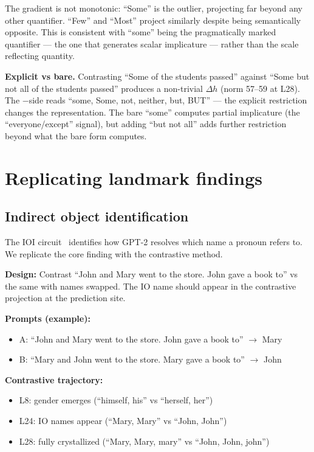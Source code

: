 \documentclass[11pt]{article}
\newcommand{\dhh}{\Delta h}
\begin{document}
The gradient is not monotonic: ``Some'' is the outlier, projecting far beyond
any other quantifier. ``Few'' and ``Most'' project similarly despite being
semantically opposite. This is consistent with ``some'' being the
pragmatically marked quantifier --- the one that generates scalar implicature
--- rather than the scale reflecting quantity.

\textbf{Explicit vs bare.} Contrasting ``Some of the students passed'' against
``Some but not all of the students passed'' produces a non-trivial $\dhh$ (norm
57--59 at L28). The $-$side reads ``some, Some, not, neither, but, BUT'' --- the
explicit restriction changes the representation. The bare ``some'' computes
partial implicature (the ``everyone/except'' signal), but adding ``but not all''
adds further restriction beyond what the bare form computes.

\section{Replicating landmark findings}

\subsection{Indirect object identification}

The IOI circuit~\citep{wang2023} identifies how GPT-2 resolves which name a
pronoun refers to. We replicate the core finding with the contrastive method.

\textbf{Design:} Contrast ``John and Mary went to the store. John gave a book to'' vs
the same with names swapped. The IO name should appear in the contrastive
projection at the prediction site.

\textbf{Prompts (example):}
\begin{itemize}[leftmargin=*]
\item A: ``John and Mary went to the store. John gave a book to'' $\rightarrow$ Mary
\item B: ``Mary and John went to the store. Mary gave a book to'' $\rightarrow$ John
\end{itemize}

\textbf{Contrastive trajectory:}
\begin{itemize}[leftmargin=*]
\item L8: gender emerges (``himself, his'' vs ``herself, her'')
\item L24: IO names appear (``Mary, Mary'' vs ``John, John'')
\item L28: fully crystallized (``Mary, Mary, mary'' vs ``John, John, john'')
\end{itemize}
\end{document}
